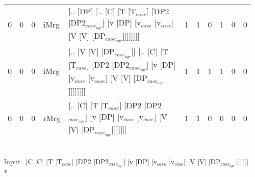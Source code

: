 \begin{tabularx}{\linewidth}{rrrlXrrrrrr}
   0 &       0 &   0 & iMrg & [.. [DP] [.. [C] [T [T$_{case}$] [DP2 [DP2$_{case_{agr}}$] [v [DP] [v$_{case}$ [v$_{case}$] [V [V] [DP$_{case_{agr}}$]]]]]]]]                                                                               &             1 &             1 &                  0 &            1 &              0 &              0 \\
   0 &       0 &   0 & iMrg & [.. [V [V] [DP$_{case_{agr}}$]] [.. [C] [T [T$_{case}$] [DP2 [DP2$_{case_{agr}}$] [v [DP] [v$_{case}$ [v$_{case}$] [V [V] [DP$_{case_{agr}}$]]]]]]]]                                                              &             1 &             1 &                  1 &            1 &              0 &              0 \\
   0 &       0 &   0 & rMrg & [.. [C] [T [T$_{case}$] [DP2 [DP2$_{case_{agr}}$] [v [DP] [v$_{case}$ [v$_{case}$] [V [V] [DP$_{case_{agr}}$]]]]]]]                                                                                         &             1 &             1 &                  0 &            0 &              0 &              0 \\
\hline
\end{tabularx}\endgroup\\
\begingroup\scriptsize Input=[C [C] [T [T$_{case}$] [DP2 [DP2$_{case_{agr}}$] [v [DP] [v$_{case}$ [v$_{case}$] [V [V] [DP$_{case_{agr}}$]]]]]]]\\*
